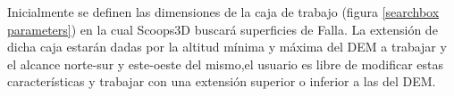 Inicialmente se definen las dimensiones de la caja de trabajo (figura \ref{searchbox parameters}) en la cual Scoops3D buscar\'{a}
superficies de Falla. La extensi\'{o}n de dicha caja estar\'{a}n dadas por la altitud m\'{i}nima y
m\'{a}xima del DEM a trabajar y el alcance norte-sur y este-oeste del mismo,el usuario es libre
de modificar estas caracter\'{i}sticas y trabajar con una extensi\'{o}n superior o inferior a las del
DEM.